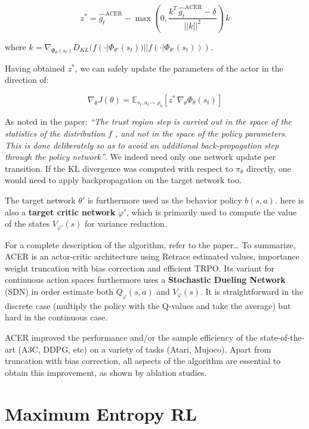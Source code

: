 \documentclass[
  letterpaper,
  DIV=11,
  numbers=noendperiod]{scrreprt}
\begin{document}
\[
    z^* = \hat{g_t}^\text{ACER} - \max(0, \frac{k^T \, \hat{g_t}^\text{ACER} - \delta}{||k||^2}) \, k
\]

where
\(k = \nabla_{\Phi_\theta(s_t)} D_{KL}( f(\cdot | \Phi_{\theta'}(s_t) ) || f(\cdot | \Phi_{\theta'}(s_t)) )\).

Having obtained \(z^*\), we can safely update the parameters of the
actor in the direction of:

\[
    \nabla_\theta J(\theta) = \mathbb{E}_{s_t, a_t \sim \rho_b} [ z^* \, \nabla_\theta \Phi_\theta(s_t) ]
\]

As noted in the paper: \emph{``The trust region step is carried out in
the space of the statistics of the distribution \(f\) , and not in the
space of the policy parameters. This is done deliberately so as to avoid
an additional back-propagation step through the policy network''}. We
indeed need only one network update per transition. If the KL divergence
was computed with respect to \(\pi_\theta\) directly, one would need to
apply backpropagation on the target network too.

The target network \(\theta'\) is furthermore used as the behavior
policy \(b(s, a)\). here is also a \textbf{target critic network}
\(\varphi'\), which is primarily used to compute the value of the states
\(V_{\varphi'}(s)\) for variance reduction.

For a complete description of the algorithm, refer to the paper\ldots{}
To summarize, ACER is an actor-critic architecture using Retrace
estimated values, importance weight truncation with bias correction and
efficient TRPO. Its variant for continuous action spaces furthermore
uses a \textbf{Stochastic Dueling Network} (SDN) in order estimate both
\(Q_\varphi(s, a)\) and \(V_\varphi(s)\). It is straightforward in the
discrete case (multiply the policy with the Q-values and take the
average) but hard in the continuous case.

ACER improved the performance and/or the sample efficiency of the
state-of-the-art (A3C, DDPG, etc) on a variety of tasks (Atari, Mujoco).
Apart from truncation with bias correction, all aspects of the algorithm
are essential to obtain this improvement, as shown by ablation studies.


\hypertarget{maximum-entropy-rl}{%
\chapter{Maximum Entropy RL}\label{maximum-entropy-rl}}
\end{document}
